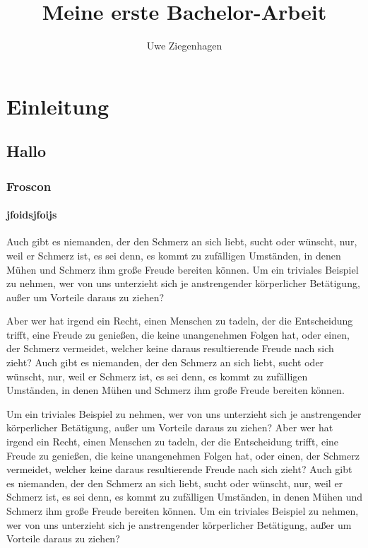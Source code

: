 \documentclass[12pt]{scrreprt}
\author{Uwe Ziegenhagen}
\title{Meine erste Bachelor-Arbeit}
\begin{document}
\maketitle

\tableofcontents

\chapter{Einleitung}

\section{Hallo}

\subsection{Froscon}

\subsubsection{jfoidsjfoijs}

Auch gibt es niemanden, der den Schmerz an sich liebt, sucht oder wünscht, nur, weil er Schmerz ist, es sei denn, es kommt zu zufälligen Umständen, in denen Mühen und Schmerz ihm große Freude bereiten können. Um ein triviales Beispiel zu nehmen, wer von uns unterzieht sich je anstrengender körperlicher Betätigung, außer um Vorteile daraus zu ziehen?

Aber wer hat irgend ein Recht, einen Menschen zu tadeln, der die Entscheidung trifft, eine Freude zu genießen, die keine unangenehmen Folgen hat, oder einen, der Schmerz vermeidet, welcher keine daraus resultierende Freude nach sich zieht? Auch gibt es niemanden, der den Schmerz an sich liebt, sucht oder wünscht, nur, weil er Schmerz ist, es sei denn, es kommt zu zufälligen Umständen, in denen Mühen und Schmerz ihm große Freude bereiten können.

Um ein triviales Beispiel zu nehmen, wer von uns unterzieht sich je anstrengender körperlicher Betätigung, außer um Vorteile daraus zu ziehen? Aber wer hat irgend ein Recht, einen Menschen zu tadeln, der die Entscheidung trifft, eine Freude zu genießen, die keine unangenehmen Folgen hat, oder einen, der Schmerz vermeidet, welcher keine daraus resultierende Freude nach sich zieht? Auch gibt es niemanden, der den Schmerz an sich liebt, sucht oder wünscht, nur, weil er Schmerz ist, es sei denn, es kommt zu zufälligen Umständen, in denen Mühen und Schmerz ihm große Freude bereiten können. Um ein triviales Beispiel zu nehmen, wer von uns unterzieht sich je anstrengender körperlicher Betätigung, außer um Vorteile daraus zu ziehen?
\end{document}
